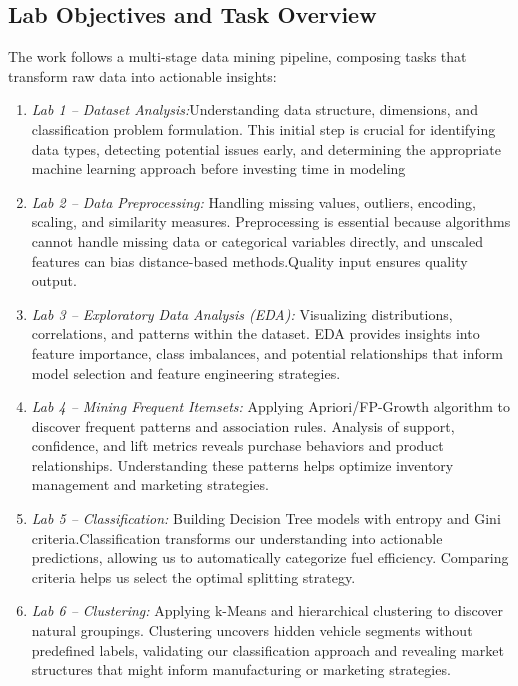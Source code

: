 \documentclass[12pt,a4paper]{article}
\begin{document}
\subsection{Lab Objectives and Task Overview}

The work follows a multi-stage data mining pipeline, composing tasks that transform raw data into actionable insights:

\begin{enumerate}
    \item \textit{Lab 1 – Dataset Analysis:}Understanding data structure, dimensions, and classification problem formulation. This initial step is crucial for identifying data types, detecting potential issues early, and determining the appropriate machine learning approach before investing time in modeling
    \item \textit{Lab 2 – Data Preprocessing:} Handling missing values, outliers, encoding, scaling, and similarity measures. Preprocessing is essential because algorithms cannot handle missing data or categorical variables directly, and unscaled features can bias distance-based methods.Quality input ensures quality output.
    \item \textit{Lab 3 – Exploratory Data Analysis (EDA):} Visualizing distributions, correlations, and patterns within the dataset. EDA provides insights into feature importance, class imbalances, and potential relationships that inform model selection and feature engineering strategies.
    \item \textit{Lab 4 – Mining Frequent Itemsets:} Applying Apriori/FP-Growth algorithm to discover frequent patterns and association rules. Analysis of support, confidence, and lift metrics reveals purchase behaviors and product relationships. Understanding these patterns helps optimize inventory management and marketing strategies.
    \item \textit{Lab 5 – Classification:} Building Decision Tree models with entropy and Gini criteria.Classification transforms our understanding into actionable predictions, allowing us to automatically categorize fuel efficiency. Comparing criteria helps us select the optimal splitting strategy.
    \item \textit{Lab 6 – Clustering:} Applying k-Means and hierarchical clustering to discover natural groupings. Clustering uncovers hidden vehicle segments without predefined labels, validating our classification approach and revealing market structures that might inform manufacturing or marketing strategies.
\end{enumerate}
\end{document}
